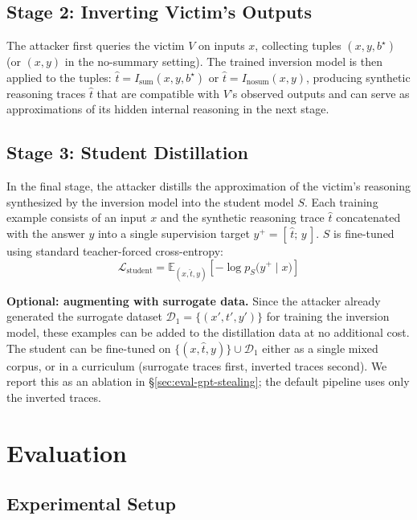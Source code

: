 \documentclass{article}
\begin{document}
\subsection{Stage 2: Inverting Victim's Outputs}
\label{sec:method-invert-victim}
The attacker first queries the victim $V$ on inputs $x$, collecting tuples $(x, y, b^{\star})$ (or $(x, y)$ in the no-summary setting). The trained inversion model is then applied to the tuples: $\hat{t} = I_{\text{sum}}(x, y, b^{\star})$ or $\hat{t} = I_{\text{nosum}}(x, y)$, producing synthetic reasoning traces $\hat{t}$ that are compatible with $V$'s observed outputs and can serve as approximations of its hidden internal reasoning in the next stage.

\subsection{Stage 3: Student Distillation}
\label{sec:method-distillation}

In the final stage, the attacker distills the approximation of the victim’s reasoning synthesized by the inversion model into the student model \(S\). Each training example consists of an input \(x\) and the synthetic reasoning trace \(\hat{t}\) concatenated with the answer \(y\) into a single supervision target
$y^{+} = [\,\hat{t};\, y\,]$.  \(S\)
is fine-tuned using standard teacher-forced cross-entropy:
\begin{equation}
  \mathcal{L}_{\mathrm{student}}
=
\mathbb{E}_{(x, \hat{t}, y)}
\left[
-\log p_S\!\big(y^{+} \mid x\big)
\right]
\end{equation}

\noindent\textbf{Optional: augmenting with surrogate data.} Since the attacker already generated the surrogate dataset $\mathcal{D}_1 = \{(x', t', y')\}$ for training the inversion model, these examples can be added to the distillation data at no additional cost. The student can be fine-tuned on $\{(x, \hat{t}, y)\} \cup \mathcal{D}_1$ either as a single mixed corpus, or in a curriculum (surrogate traces first, inverted traces second). We report this as an ablation in \S\ref{sec:eval-gpt-stealing}; the default pipeline uses only the inverted traces.



\section{Evaluation}
\label{sec:eval}


\subsection{Experimental Setup}
\label{sec:eval-setup}
\end{document}
